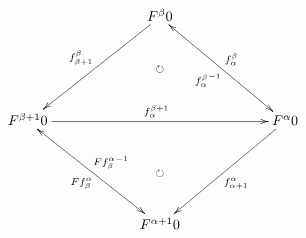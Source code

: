 \documentclass[12pt]{article}
\begin{document}
\pagestyle{empty}

\begin{align*}
  \vcenter{
    \xymatrix@=60pt{
      &
      F^\beta 0
      \ar@{->}[ld]_{f^\beta_{\beta + 1}}
      \ar@{<->}[rd]^{f^\beta_\alpha}_{{f^\beta_\alpha}^{-1}}
      \ar@{{}{ }{}}[d]|{\circlearrowright}
      \\
      F^{\beta + 1} 0
      \ar@{->}[rr]^{f^{\beta + 1}_\alpha}
      & &
      F^\alpha 0
      \ar@{->}[ld]^{f^\alpha_{\alpha + 1}}
      \\
      &
      F^{\alpha + 1} 0
      \ar@{<->}[lu]^{F f^\alpha_\beta}_{F {f^\alpha_\beta}^{-1}}
      \ar@{{}{ }{}}[u]|{\circlearrowright}
      &
    }
  }
\end{align*}
\end{document}
